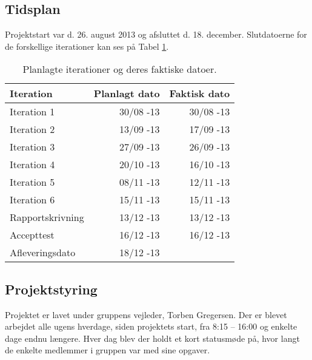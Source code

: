 \documentclass[Main]{subfiles}
\begin{document}
\newpage
\subsection{Tidsplan}
Projektstart var d. 26. august 2013 og afsluttet d. 18. december.
Slutdatoerne for de forskellige iterationer kan ses på Tabel \ref{Tab:Tidsplan}.

\begin{table}[H]
\centering
	\begin{tabular}{l r r}
	\hline
	\textbf{Iteration} & \textbf{Planlagt dato} & \textbf{Faktisk dato} \\ \hline
	Iteration 1 & 30/08 -13 & 30/08 -13\\
	Iteration 2 & 13/09 -13 & 17/09 -13\\
	Iteration 3 & 27/09 -13 & 26/09 -13\\
	Iteration 4 & 20/10 -13 & 16/10 -13\\
	Iteration 5 & 08/11 -13 & 12/11 -13\\
	Iteration 6 & 15/11 -13 & 15/11 -13\\
	Rapportskrivning & 13/12 -13 & 13/12 -13 \\
	Accepttest	& 16/12 -13 & 16/12 -13\\
	Afleveringsdato & 18/12 -13 & 
	\\ \hline
	\end{tabular}
\caption{Planlagte iterationer og deres faktiske datoer.}
\label{Tab:Tidsplan}
\end{table}


\subsection{Projektstyring}
Projektet er lavet under gruppens vejleder, Torben Gregersen.
Der er blevet arbejdet alle ugens hverdage, siden projektets start, fra 8:15 -- 16:00 og enkelte dage endnu længere.
Hver dag blev der holdt et kort statusmøde på, hvor langt de enkelte medlemmer i gruppen var med sine opgaver.
\end{document}

